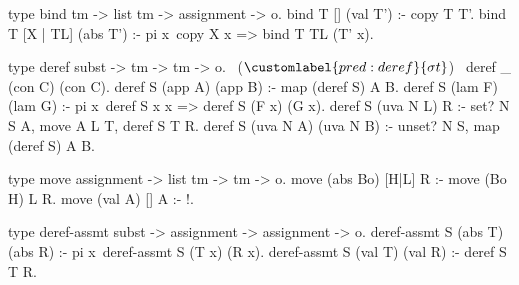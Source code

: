 \begin{elpicode}
  type bind tm -> list tm -> assignment -> o.
  bind T [] (val T') :- copy T T'.
  bind T [X | TL] (abs T') :- pi x\ copy X x => bind T TL (T' x).

  type deref subst -> tm -> tm -> o.                   ~($\customlabel{pred:deref}{\sigma t}$)~
  deref _ (con C) (con C).
  deref S (app A) (app B) :- map (deref S) A B.
  deref S (lam F) (lam G) :-
    pi x\ deref S x x => deref S (F x) (G x).
  deref S (uva N L) R :- set? N S A,
    move A L T, deref S T R.
  deref S (uva N A) (uva N B) :- unset? N S,
    map (deref S) A B.

  type move assignment -> list tm -> tm -> o.
  move (abs Bo) [H|L] R :- move (Bo H) L R.
  move (val A)  [] A :- !.


  type deref-assmt subst -> assignment -> assignment -> o.
  deref-assmt S (abs T) (abs R) :- pi x\ deref-assmt S (T x) (R x).
  deref-assmt S (val T) (val R) :- deref S T R.
\end{elpicode}
